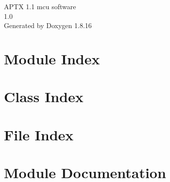 \let\mypdfximage\pdfximage\def\pdfximage{\immediate\mypdfximage}\documentclass[twoside]{book}
\newcommand{\+}{\discretionary{\mbox{\scriptsize$\hookleftarrow$}}{}{}}
\newcommand{\clearemptydoublepage}{%
  \newpage{\pagestyle{empty}\cleardoublepage}%
}
\begin{document}
\hypersetup{pageanchor=false,
             bookmarksnumbered=true,
             pdfencoding=unicode
            }
\begin{titlepage}
\vspace*{7cm}
\begin{center}%
{\Large A\+P\+TX 1.1 mcu software \\[1ex]\large 1.\+0 }\\
\vspace*{1cm}
{\large Generated by Doxygen 1.8.16}\\
\end{center}
\end{titlepage}
\clearemptydoublepage
{}
\tableofcontents
\clearemptydoublepage
{}
\hypersetup{pageanchor=true}

\chapter{Module Index}

\chapter{Class Index}

\chapter{File Index}

\chapter{Module Documentation}

















\end{document}
